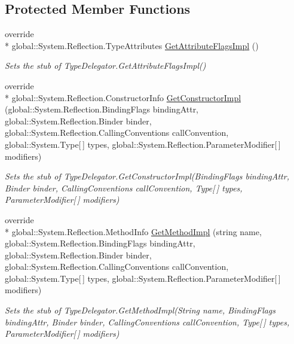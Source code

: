 \subsection*{Protected Member Functions}
\begin{DoxyCompactItemize}
\item 
override \\*
global\-::\-System.\-Reflection.\-Type\-Attributes \hyperlink{class_system_1_1_reflection_1_1_fakes_1_1_stub_type_delegator_aaaf09b7bd93598c3e579d02773c97376}{Get\-Attribute\-Flags\-Impl} ()
\begin{DoxyCompactList}\small\item\em Sets the stub of Type\-Delegator.\-Get\-Attribute\-Flags\-Impl()\end{DoxyCompactList}\item 
override \\*
global\-::\-System.\-Reflection.\-Constructor\-Info \hyperlink{class_system_1_1_reflection_1_1_fakes_1_1_stub_type_delegator_ab07f53e9db53200fd3e22da6e3587284}{Get\-Constructor\-Impl} (global\-::\-System.\-Reflection.\-Binding\-Flags binding\-Attr, global\-::\-System.\-Reflection.\-Binder binder, global\-::\-System.\-Reflection.\-Calling\-Conventions call\-Convention, global\-::\-System.\-Type\mbox{[}$\,$\mbox{]} types, global\-::\-System.\-Reflection.\-Parameter\-Modifier\mbox{[}$\,$\mbox{]} modifiers)
\begin{DoxyCompactList}\small\item\em Sets the stub of Type\-Delegator.\-Get\-Constructor\-Impl(\-Binding\-Flags binding\-Attr, Binder binder, Calling\-Conventions call\-Convention, Type\mbox{[}$\,$\mbox{]} types, Parameter\-Modifier\mbox{[}$\,$\mbox{]} modifiers)\end{DoxyCompactList}\item 
override \\*
global\-::\-System.\-Reflection.\-Method\-Info \hyperlink{class_system_1_1_reflection_1_1_fakes_1_1_stub_type_delegator_aa98e1f693b5e7804f7664f594741ec32}{Get\-Method\-Impl} (string name, global\-::\-System.\-Reflection.\-Binding\-Flags binding\-Attr, global\-::\-System.\-Reflection.\-Binder binder, global\-::\-System.\-Reflection.\-Calling\-Conventions call\-Convention, global\-::\-System.\-Type\mbox{[}$\,$\mbox{]} types, global\-::\-System.\-Reflection.\-Parameter\-Modifier\mbox{[}$\,$\mbox{]} modifiers)
\begin{DoxyCompactList}\small\item\em Sets the stub of Type\-Delegator.\-Get\-Method\-Impl(\-String name, Binding\-Flags binding\-Attr, Binder binder, Calling\-Conventions call\-Convention, Type\mbox{[}$\,$\mbox{]} types, Parameter\-Modifier\mbox{[}$\,$\mbox{]} modifiers)\end{DoxyCompactList}\item 

\end{DoxyCompactItemize}
